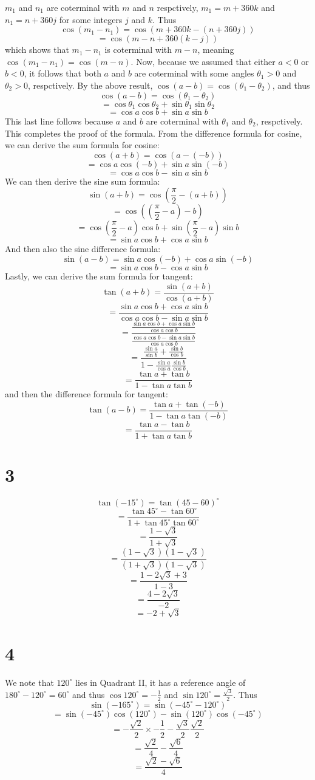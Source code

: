 \documentclass{article}
\theoremstyle{definition}
\newcommand{\?}{\stackrel{?}{=}}
\begin{document}
$m_1$ and $n_1$ are coterminal with $m$ and $n$ respctively, $m_1=m+360k$ and $n_1=n+360j$ for some integers $j$ and $k$. Thus
\[ \cos(m_1-n_1)=\cos(m+360k-(n+360j)) \]
\[ =\cos(m-n+360(k-j)) \] which shows that $m_1-n_1$ is coterminal with $m-n$, meaning $\cos(m_1-n_1)=\cos(m-n)$. Now, because we assumed that 
either $a<0$ or $b<0$, it follows that both $a$ and $b$ are coterminal with some angles $\theta_1>0$ and $\theta_2>0$, respctively. By the above result, 
$\cos(a-b)=\cos(\theta_1-\theta_2)$, and thus
\[ \cos(a-b)=\cos(\theta_1-\theta_2) \]
\[ =\cos\theta_1\cos\theta_2+\sin\theta_1\sin\theta_2 \]
\[ =\cos a\cos b+\sin a\sin b \] This last line follows because $a$ and $b$ are coterminal with $\theta_1$ and $\theta_2$, respctively. This completes the proof of 
the formula.
From the difference formula for cosine, we can derive the sum formula for cosine:
\[ \cos(a+b)=\cos(a-(-b)) \]
\[ =\cos a\cos(-b)+\sin a\sin(-b) \]
\[ =\cos a\cos b-\sin a\sin b \]
We can then derive the sine sum formula:
\[ \sin(a+b)=\cos(\frac{\pi}{2}-(a+b)) \]
\[ =\cos((\frac{\pi}{2}-a)-b) \]
\[ =\cos(\frac{\pi}{2}-a)\cos b+\sin(\frac{\pi}{2}-a)\sin b \]
\[ =\sin a\cos b+\cos a\sin b \]
And then also the sine difference formula:
\[ \sin(a-b)=\sin a\cos(-b)+\cos a\sin(-b) \]
\[ =\sin a\cos b-\cos a\sin b \]
Lastly, we can derive the sum formula for tangent:
\[ \tan(a+b)=\dfrac{\sin(a+b)}{\cos(a+b)} \]
\[ =\dfrac{\sin a\cos b+\cos a\sin b}{\cos a\cos b-\sin a\sin b} \]
\[ =\dfrac{\frac{\sin a\cos b+\cos a\sin b}{\cos a\cos b}}{\frac{\cos a\cos b-\sin a\sin b}{\cos a\cos b}} \]
\[ =\dfrac{\frac{\sin a}{\sin b}+\frac{\sin b}{\cos b}}{1-\frac{\sin a}{\cos a}\frac{\sin b}{\cos b}} \]
\[ =\dfrac{\tan a+\tan b}{1-\tan a\tan b} \]
and then the difference formula for tangent:
\[ \tan(a-b)=\dfrac{\tan a+\tan(-b)}{1-\tan a\tan(-b)} \]
\[ =\dfrac{\tan a-\tan b}{1+\tan a\tan b} \]

\section*{3}
\[ \tan(-15^\circ)=\tan(45-60)^\circ \]
\[ =\frac{\tan 45^\circ-\tan 60^\circ}{1+\tan 45^\circ\tan 60^\circ} \]
\[ =\dfrac{1-\sqrt{3}}{1+\sqrt{3}} \]
\[ =\dfrac{(1-\sqrt{3})(1-\sqrt{3})}{(1+\sqrt{3})(1-\sqrt{3})} \]
\[ =\dfrac{1-2\sqrt{3}+3}{1-3} \]
\[ =\frac{4-2\sqrt{3}}{-2} \]
\[ =-2+\sqrt{3} \]

\section*{4}
We note that $120^\circ$ lies in Quadrant II, it has a reference angle of $180^\circ-120^\circ=60^\circ$ and thus 
$\cos 120^\circ=-\frac{1}{2}$ and $\sin 120^\circ=\frac{\sqrt{3}}{2}$. Thus
\[ \sin(-165^\circ)=\sin(-45^\circ-120^\circ) \]
\[ =\sin(-45^\circ)\cos(120^\circ)-\sin(120^\circ)\cos(-45^\circ) \]
\[ =-\frac{\sqrt{2}}{2}\times -\frac{1}{2}-\frac{\sqrt{3}}{2}\frac{\sqrt{2}}{2} \]
\[ =\frac{\sqrt{2}}{4}-\frac{\sqrt{6}}{4} \]
\[ =\frac{\sqrt{2}-\sqrt{6}}{4} \]
\end{document}
